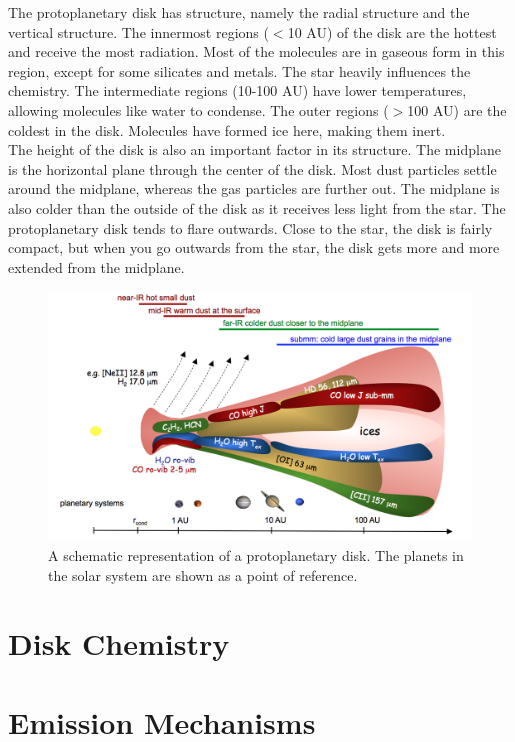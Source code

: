 \documentclass[twoside, single, authoryear, semicolon]{lion-msc}
\newcommand{\4}{$_4$}
\newcommand{\3}{$_3$}
\newcommand{\2}{$_2$}
\begin{document}
The protoplanetary disk has structure, namely the radial structure and the vertical structure. The innermost regions ($<$10 AU) of the disk are the hottest and receive the most radiation. Most of the molecules are in gaseous form in this region, except for some silicates and metals. The star heavily influences the chemistry. The intermediate regions (10-100 AU) have lower temperatures, allowing molecules like water to condense. The outer regions ($>$100 AU) are the coldest in the disk. Molecules have formed ice here, making them inert. \\
The height of the disk is also an important factor in its structure. The midplane is the horizontal plane through the center of the disk. Most dust particles settle around the midplane, whereas the gas particles are further out. The midplane is also colder than the outside of the disk as it receives less light from the star. The protoplanetary disk tends to flare outwards. Close to the star, the disk is fairly compact, but when you go outwards from the star, the disk gets more and more extended from the midplane. 

\begin{figure}[!ht]
    \centering
    \includegraphics[width=\linewidth]{Figures/disk-sketch.png}
    \caption{A schematic representation of a protoplanetary disk. The planets in the solar system are shown as a point of reference. \cite{inproceedings}}
    \label{fig:enter-label}
\end{figure}

\section{Disk Chemistry}

\section{Emission Mechanisms}
\end{document}
